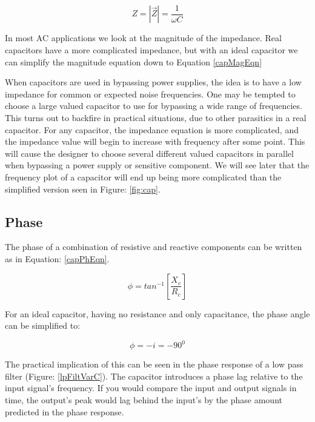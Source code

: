 \begin{equation}
\label{capMagEqn}
Z = |\vec{Z}| = \frac{1}{\omega C}
\end{equation}

In most AC applications we look at the magnitude of the impedance. Real capacitors have a more complicated impedance, but with an ideal capacitor we can simplify the magnitude equation down to Equation \eqref{capMagEqn}

When capacitors are used in bypassing power supplies, the idea is to have a low impedance for common or expected noise frequencies. One may be tempted to choose a large valued capacitor to use for bypassing a wide range of frequencies. This turns out to backfire in practical situations, due to other parasitics in a real capacitor. For any capacitor, the impedance equation is more complicated, and the impedance value will begin to increase with frequency after some point. This will cause the designer to choose several different valued capacitors in parallel when bypassing a power supply or sensitive component. We will see later that the frequency plot of a capacitor will end up being more complicated than the simplified version seen in Figure: \ref{fig:cap}.



\subsection{Phase}

The phase of a combination of resistive and reactive components can be written as in Equation: \eqref{capPhEqn}.

\begin{equation}
\label{capPhEqn}
\phi = tan^{-1}[\frac{X_c}{R_c}]
\end{equation}

For an ideal capacitor, having no resistance and only capacitance, the phase angle can be simplified to:

\begin{equation}
\label{capImpEqu2}
\phi = -i = -90^0
\end{equation}

The practical implication of this can be seen in the phase response of a low pass filter (Figure: \ref{lpFiltVarC}). The capacitor introduces a phase lag relative to the input signal's frequency. If you would compare the input and output signals in time, the output's peak would lag behind the input's by the phase amount predicted in the phase response.


